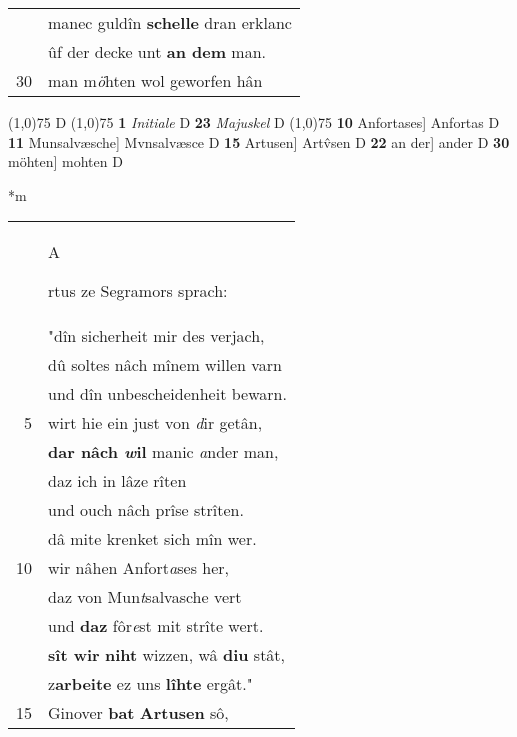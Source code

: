 \documentclass[8pt,a4paper,notitlepage]{article}
\begin{document}
\begin{table}[ht]
\begin{minipage}[t]{0.5\linewidth}
\begin{tabular}{rl}
 & manec guldîn \textbf{schelle} dran erklanc\\ 
 & ûf der decke unt \textbf{an dem} man.\\ 
30 & man m\textit{ö}hten wol geworfen hân\\ 
\end{tabular}
\scriptsize
\line(1,0){75} \newline
D \newline
\line(1,0){75} \newline
\textbf{1} \textit{Initiale} D  \textbf{23} \textit{Majuskel} D  \newline
\line(1,0){75} \newline
\textbf{10} Anfortases] Anfortas D \textbf{11} Munsalvæsche] Mvnsalvæsce D \textbf{15} Artusen] Artv̂sen D \textbf{22} an der] ander D \textbf{30} möhten] mohten D \newline
\end{minipage}
\hspace{0.5cm}
\begin{minipage}[t]{0.5\linewidth}
\small
\begin{center}*m
\end{center}
\begin{tabular}{rl}
 & \begin{large}A\end{large}rtus ze Segramors sprach:\\ 
 & "dîn sicherheit mir des verjach,\\ 
 & dû soltes nâch mînem willen varn\\ 
 & und dîn unbescheidenheit bewarn.\\ 
5 & wirt hie ein just von \textit{d}ir getân,\\ 
 & \textbf{dar nâch \textit{w}il} manic \textit{a}nder man,\\ 
 & daz ich in lâze rîten\\ 
 & und ouch nâch prîse strîten.\\ 
 & dâ mite krenket sich mîn wer.\\ 
10 & wir nâhen Anfort\textit{a}ses her,\\ 
 & daz von Mun\textit{t}salvasche vert\\ 
 & und \textbf{daz} fôr\textit{e}st mit strîte wert.\\ 
 & \textbf{sît wir} \textbf{niht} wizzen, wâ \textbf{diu} stât,\\ 
 & z\textbf{arbeite} ez uns \textbf{lîhte} ergât."\\ 
15 & Ginover \textbf{bat} \textbf{Artusen} sô,\\ 

\end{tabular}
\end{minipage}
\end{table}
\end{document}
